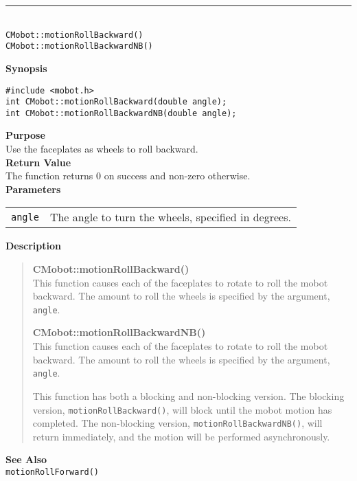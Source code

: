 \noindent
\vspace{5pt}
\rule{4.5in}{0.015in}\\
\noindent
{\LARGE \texttt{CMobot::motionRollBackward()}}\\
{\LARGE \texttt{CMobot::motionRollBackwardNB()}}\\
{}

\noindent
{\bf Synopsis}
\vspace{-8pt}
\begin{verbatim}
#include <mobot.h>
int CMobot::motionRollBackward(double angle);
int CMobot::motionRollBackwardNB(double angle);
\end{verbatim}

\noindent
{\bf Purpose}\\
Use the faceplates as wheels to roll backward.\\

\noindent
{\bf Return Value}\\
The function returns 0 on success and non-zero otherwise.\\

\noindent
{\bf Parameters}\\
\vspace{-0.1in}
\begin{description}
\item               
\begin{tabular}{p{15 mm}p{145 mm}}
\texttt{angle} & The angle to turn the wheels, specified in degrees.\\
\end{tabular}
\end{description}

\noindent
{\bf Description}\\
\vspace{-12pt}
\begin{quote}
{\bf CMobot::motionRollBackward()}\\
This function causes each of the faceplates to rotate to roll the
mobot backward. The amount to roll the wheels is specified by the argument,
\texttt{angle}.

{\bf CMobot::motionRollBackwardNB()}\\
This function causes each of the faceplates to rotate to roll the
mobot backward. The amount to roll the wheels is specified by the argument,
\texttt{angle}.

This function has both a blocking and non-blocking version.
The blocking version, \texttt{motionRollBackward()}, will block until the
mobot motion has completed. The non-blocking version, \texttt{motionRollBackwardNB()},
will return immediately, and the motion will be performed asynchronously.\\
\end{quote}

\noindent
{\bf See Also}\\
\texttt{motionRollForward()}

